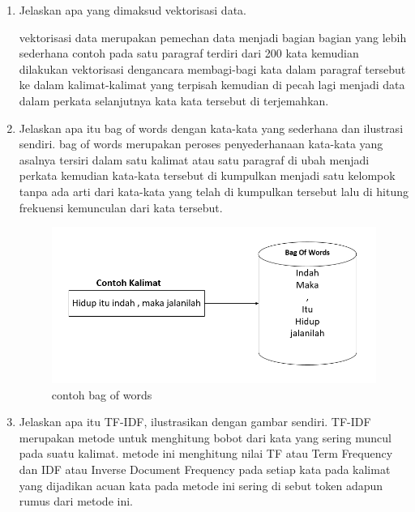 \begin{enumerate}
\item Jelaskan apa yang dimaksud vektorisasi data.\par
vektorisasi data merupakan pemechan data menjadi bagian bagian yang lebih sederhana contoh pada satu paragraf terdiri dari 200 kata kemudian dilakukan vektorisasi dengancara membagi-bagi kata dalam paragraf tersebut ke dalam kalimat-kalimat yang terpisah kemudian di pecah lagi menjadi data dalam perkata selanjutnya kata kata tersebut di terjemahkan.

\item Jelaskan apa itu bag of words dengan kata-kata yang sederhana dan ilustrasi sendiri.
 bag of words merupakan peroses penyederhanaan kata-kata yang asalnya tersiri dalam satu kalimat atau satu paragraf di ubah menjadi perkata kemudian kata-kata tersebut di kumpulkan menjadi satu kelompok tanpa ada arti dari kata-kata yang telah di kumpulkan tersebut lalu di hitung frekuensi kemunculan dari kata tersebut.
 
\begin{figure}[ht]
\centering
\includegraphics[scale=0.2]{figures/1174042/chapter4/1,5.PNG}
\caption{contoh bag of words}
\label{contoh}
\end{figure}

\item Jelaskan apa itu TF-IDF, ilustrasikan dengan gambar sendiri.
 TF-IDF merupakan metode untuk menghitung bobot dari kata yang sering muncul pada suatu kalimat. metode ini menghitung nilai TF atau Term Frequency dan IDF atau Inverse Document Frequency pada setiap kata pada kalimat yang dijadikan acuan kata pada metode ini sering di sebut token adapun rumus dari metode ini.
 

\end{enumerate}
